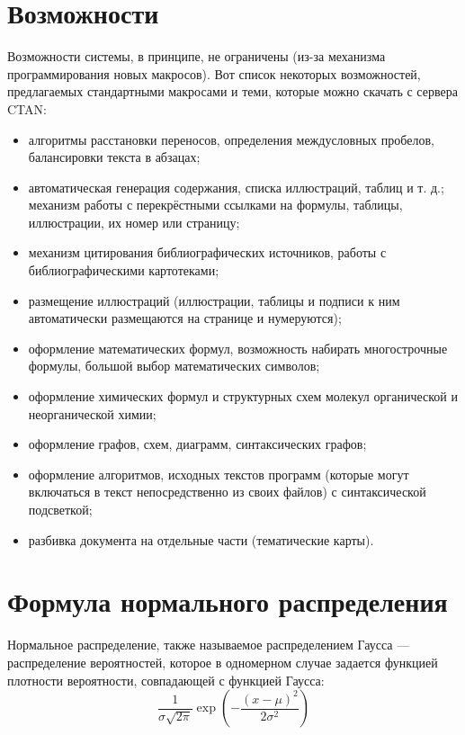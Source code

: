 \documentclass[10pt,a4paper]{article}
\begin{document}
\section{Возможности}
\hspace{0,6cm}Возможности системы, в принципе, не ограничены (из-за механизма программирования новых макросов). Вот список некоторых возможностей, предлагаемых стандартными макросами и теми, которые можно скачать  с сервера CTAN:
\begin{itemize}
\item алгоритмы расстановки переносов, определения междусловных пробелов, балансировки текста в абзацах;
\item автоматическая генерация содержания, списка иллюстраций, таблиц и т. д.;
механизм работы с перекрёстными ссылками на формулы, таблицы, иллюстрации, их номер или страницу;
\item механизм цитирования библиографических источников, работы с библиографическими картотеками;
\item размещение иллюстраций (иллюстрации, таблицы и подписи к ним автоматически размещаются на странице и нумеруются);
\item оформление математических формул, возможность набирать многострочные формулы, большой выбор математических символов;
\item оформление химических формул и структурных схем молекул органической и неорганической химии;
\item оформление графов, схем, диаграмм, синтаксических графов;
\item оформление алгоритмов, исходных текстов программ (которые могут включаться в текст непосредственно из своих файлов) с синтаксической подсветкой;
\item разбивка документа на отдельные части (тематические карты).
\end{itemize}

\section{Формула нормального распределения}
\hspace{0,6cm}Нормальное распределение, также называемое распределением Гаусса — распределение вероятностей, которое в одномерном случае задается функцией плотности вероятности, совпадающей с функцией Гаусса:
\begin{equation}
\frac{1}{\sigma\sqrt{2\pi}}
   \exp\left(-\frac{(x-\mu)^2}{2\sigma^2}\right)
\end{equation}\
\end{document}
